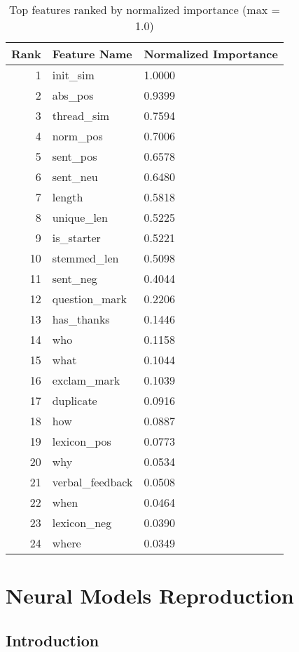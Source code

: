 \documentclass{article}
\begin{document}
\begin{table}[H]
\centering
\caption{Top features ranked by normalized importance (max = 1.0)}
\label{tab:feature-importance}
\begin{tabular}{rll}
\toprule
\textbf{Rank} & \textbf{Feature Name} & \textbf{Normalized Importance} \\
\midrule
1  & init\_sim         & 1.0000 \\
2  & abs\_pos          & 0.9399 \\
3  & thread\_sim       & 0.7594 \\
4  & norm\_pos         & 0.7006 \\
5  & sent\_pos         & 0.6578 \\
6  & sent\_neu         & 0.6480 \\
7  & length            & 0.5818 \\
8  & unique\_len       & 0.5225 \\
9  & is\_starter       & 0.5221 \\
10 & stemmed\_len      & 0.5098 \\
11 & sent\_neg         & 0.4044 \\
12 & question\_mark    & 0.2206 \\
13 & has\_thanks       & 0.1446 \\
14 & who               & 0.1158 \\
15 & what              & 0.1044 \\
16 & exclam\_mark      & 0.1039 \\
17 & duplicate         & 0.0916 \\
18 & how               & 0.0887 \\
19 & lexicon\_pos      & 0.0773 \\
20 & why               & 0.0534 \\
21 & verbal\_feedback  & 0.0508 \\
22 & when              & 0.0464 \\
23 & lexicon\_neg      & 0.0390 \\
24 & where             & 0.0349 \\
\bottomrule
\end{tabular}
\end{table}

\section{Neural Models Reproduction}
\subsection{Introduction}
\end{document}
